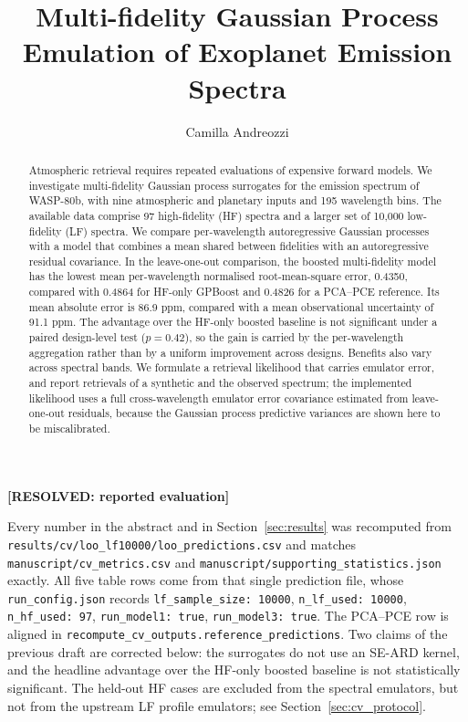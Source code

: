 \documentclass[12pt, letterpaper, oneside]{article}
\title{\textbf{Multi-fidelity Gaussian
Process Emulation of Exoplanet Emission
Spectra}}
\author{Camilla Andreozzi}
\affiliation{ETH Zürich}
\newcommand{\resolved}[2]{\par\begingroup\small\color{green!35!black}%
\noindent\textbf{[RESOLVED: #1]}\par\nobreak\noindent #2\par\endgroup}
\begin{document}
\maketitle
\begin{abstract}
Atmospheric retrieval requires repeated evaluations of expensive forward
models. We investigate multi-fidelity Gaussian process surrogates for the
emission spectrum of WASP-80b, with nine atmospheric and planetary inputs
and 195 wavelength bins. The available data comprise 97 high-fidelity
(HF) spectra and a larger set of 10{,}000 low-fidelity (LF) spectra.
We compare per-wavelength autoregressive Gaussian processes with a model
that combines a mean shared between fidelities with an autoregressive
residual covariance. In the leave-one-out comparison, the boosted
multi-fidelity model has the lowest mean per-wavelength normalised
root-mean-square error, 0.4350, compared with 0.4864 for HF-only GPBoost
and 0.4826 for a PCA--PCE reference. Its mean absolute error is 86.9 ppm,
compared with a mean observational uncertainty of 91.1 ppm. The advantage
over the HF-only boosted baseline is not significant under a paired
design-level test ($p=0.42$), so the gain is carried by the per-wavelength
aggregation rather than by a uniform improvement across designs. Benefits
also vary across spectral bands. We formulate a retrieval likelihood that
carries emulator error, and report retrievals of a synthetic and the
observed spectrum; the implemented likelihood uses a full cross-wavelength
emulator error covariance estimated from leave-one-out residuals, because
the Gaussian process predictive variances are shown here to be
miscalibrated.
\end{abstract}

\resolved{reported evaluation}{Every number in the abstract and in
Section~\ref{sec:results} was recomputed from
\texttt{results/cv/loo\_lf10000/loo\_predictions.csv} and matches
\texttt{manuscript/cv\_metrics.csv} and
\texttt{manuscript/supporting\_statistics.json} exactly. All five table rows
come from that single prediction file, whose
\texttt{run\_config.json} records \texttt{lf\_sample\_size: 10000},
\texttt{n\_lf\_used: 10000}, \texttt{n\_hf\_used: 97},
\texttt{run\_model1: true}, \texttt{run\_model3: true}. The PCA--PCE row is
aligned in \texttt{recompute\_cv\_outputs.reference\_predictions}. Two claims
of the previous draft are corrected below: the surrogates do not use an SE-ARD
kernel, and the headline advantage over the HF-only boosted baseline is not
statistically significant. The held-out HF cases are excluded from the
spectral emulators, but not from the upstream LF profile emulators; see
Section~\ref{sec:cv_protocol}.}
\end{document}
